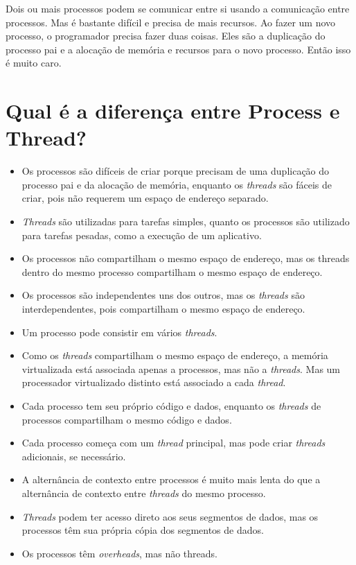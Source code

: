 Dois ou mais processos podem se comunicar entre si usando a comunicação entre processos. Mas é bastante difícil e precisa de mais recursos. Ao fazer um novo processo, o programador precisa fazer duas coisas. Eles são a duplicação do processo pai e a alocação de memória e recursos para o novo processo. Então isso é muito caro.

\section{Qual é a diferença entre Process e Thread?}

\begin{itemize}
    \item Os processos são difíceis de criar porque precisam de uma duplicação do processo pai e da alocação de memória, enquanto os \textit{threads} são fáceis de criar, pois não requerem um espaço de endereço separado.

    \item \textit{Threads} são utilizadas para tarefas simples, quanto os processos são utilizado para tarefas pesadas, como a execução de um aplicativo.

    \item Os processos não compartilham o mesmo espaço de endereço, mas os threads dentro do mesmo processo compartilham o mesmo espaço de endereço.

    \item Os processos são independentes uns dos outros, mas os \textit{threads} são interdependentes, pois compartilham o mesmo espaço de endereço.

    \item Um processo pode consistir em vários \textit{threads}.

    \item Como os \textit{threads} compartilham o mesmo espaço de endereço, a memória virtualizada está associada apenas a processos, mas não a \textit{threads}. Mas um processador virtualizado distinto está associado a cada \textit{thread}.

    \item Cada processo tem seu próprio código e dados, enquanto os \textit{threads} de processos compartilham o mesmo código e dados.

    \item Cada processo começa com um \textit{thread} principal, mas pode criar \textit{threads} adicionais, se necessário.

    \item A alternância de contexto entre processos é muito mais lenta do que a alternância de contexto entre \textit{threads} do mesmo processo.

    \item \textit{Threads} podem ter acesso direto aos seus segmentos de dados, mas os processos têm sua própria cópia dos segmentos de dados.

    \item Os processos têm \textit{overheads}, mas não threads.
\end{itemize}

